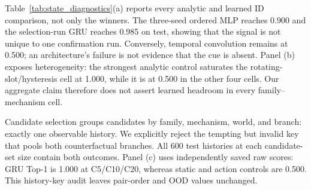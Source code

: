 \documentclass[letterpaper,10pt,conference]{ieeeconf}
\begin{document}
\begin{table}[t]
    \centering
    \caption{State pair-order accuracy. The analytic method is selected on
    validation for ID; each OOD row reports its frozen best fair analytic
    comparator.}
    \label{tab:state}
    \resizebox{\columnwidth}{!}{}
\end{table}

Table~\ref{tab:state_diagnostics}(a) reports every analytic and learned ID
comparison, not only the winners. The three-seed ordered MLP reaches 0.900 and
the selection-run GRU reaches 0.985 on test, showing that the signal is not
unique to one confirmation run. Conversely, temporal convolution remains at
0.500; an architecture's failure is not evidence that the cue is absent.
Panel (b) exposes heterogeneity: the strongest analytic control saturates the
rotating-slot/hysteresis cell at 1.000, while it is at 0.500 in the other four
cells. Our aggregate claim therefore does not assert learned headroom in every
family--mechanism cell.

Candidate selection groups candidates by family, mechanism, world, and branch:
exactly one observable history. We explicitly reject the tempting but invalid
key that pools both counterfactual branches.
All 600 test histories at each candidate-set size contain both outcomes.
Panel (c) uses independently saved raw scores: GRU Top-1 is 1.000 at
C5/C10/C20, whereas static and action controls are 0.500. This history-key
audit leaves pair-order and OOD values unchanged.
\end{document}
